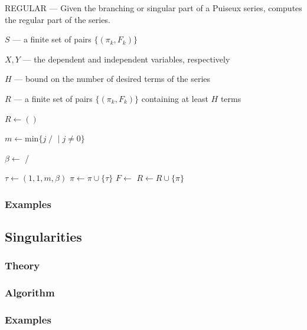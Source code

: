 \documentclass[10pt,twoside]{article}
\newcommand{\Input}{\Require}
\newcommand{\Output}{\Ensure}
\newcommand{\ForEach}{\ForAll}
\numberwithin{equation}{section}
\begin{document}
\begin{algorithm}[h]
\caption{REGULAR --- Given the branching or singular part of a Puiseux
  series, computes the regular part of the series.}
\label{alg: puiseux-regular}
\begin{algorithmic}[1]
\Input

$S$ --- a finite set of pairs $\{(\pi_k,F_k)\}$

$X,Y$ --- the dependent and independent variables, respectively

$H$ --- bound on the number of desired terms of the series

\Output $R$ --- a finite set of pairs $\{(\pi_k,F_k)\}$ containing at
least $H$ terms

  \State $R \leftarrow ()$
  \ForEach{$(\pi,F)$ {\bf in} $S$}

      \State $m \leftarrow \text{min} \{ j \; /$
       $ \; | \; j \neq 0 \}$

      \State $\beta \leftarrow$  /

      \State $\tau \leftarrow (1,1,m,\beta)$
      \State $\pi \leftarrow \pi \cup \{\tau\}$
      \State $F \leftarrow$ 
    \EndWhile
    \State $R \leftarrow R \cup \{\pi\}$
  \EndFor
\EndFunction
\end{algorithmic}
\end{algorithm}


\subsubsection*{Examples}
%

\subsection{Singularities}

%
\subsubsection*{Theory}
%
%
\subsubsection*{Algorithm}
%
%
\subsubsection*{Examples}
%
\end{document}
